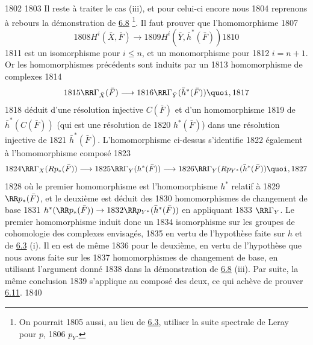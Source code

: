   1802	
  1803	Il reste à traiter le cas (iii), et pour celui-ci encore nous
  1804	reprenons à rebours la démonstration de \hyperref[XII.prop6.8]{6.8} \footnote[1]{On pourrait
  1805	aussi, au lieu de \hyperref[XII.cor6.3]{6.3}, utiliser la suite spectrale de Leray pour $p$,
  1806	$p_Y$.}. Il faut prouver que l'homomorphisme
  1807	$$
  1808	H^{i}(\bar{X},\bar{F})\longrightarrow
  1809	H^{i}(\bar{Y},\bar{h}^{\ast}(\bar{F}))
  1810	$$
  1811	est un isomorphisme pour $i\leq n$, et un monomorphisme pour
  1812	$i=n+1$. Or les homomorphismes précédents sont induits par un
  1813	homomorphisme de complexes
  1814	$$
  1815	\RR\Gamma_{\bar{X}}(\bar{F})\longrightarrow
  1816	\RR\Gamma_{\bar{Y}}(\bar{h}^{\ast}(\bar{F})){\quoi},
  1817	$$
  1818	déduit d'une résolution injective $C(\bar{F})$ et d'un homomorphisme
  1819	de $\bar{h}^{\ast}(C(\bar{F}))$ (qui est une résolution de
  1820	$h^{\ast}(\bar{F})$) dans une résolution injective de
  1821	$\bar{h}^{\ast}(\bar{F})$. L'homomorphisme ci-dessus s'identifie
  1822	également à l'homomorphisme composé
  1823	$$
  1824	\RR\Gamma_X(Rp_{\ast}(\bar{F}))\longrightarrow
  1825	\RR\Gamma_Y(h^{\ast}(\bar{F}))\longrightarrow
  1826	\RR\Gamma_Y(Rp_{Y^{\ast}}(\bar{h}^{\ast}(\bar{F})){\quoi},
  1827	$$
  1828	où le premier homomorphisme est l'homomorphisme $h^{\ast}$ relatif à
  1829	$\RR p_{\ast}(\bar{F})$, et le deuxième est déduit des
  1830	homomorphismes de changement de base
  1831	$h^{\ast}(\RR p_{\ast}(\bar{F}))\rightarrow
  1832	\RR p_{Y^{\ast}}(\bar{h}^{\ast}(\bar{F}))$ en appliquant
  1833	$\RR\Gamma_Y$. Le premier homomorphisme induit donc un
  1834	isomorphisme sur les groupes de cohomologie des complexes envisagés,
  1835	en vertu de l'hypothèse faite sur $h$ et de \hyperref[XII.cor6.3]{6.3} (i). Il en est de même
  1836	pour le deuxième, en vertu de l'hypothèse que nous avons faite sur les
  1837	homomorphismes de changement de base, en utilisant l'argument donné
  1838	dans la démonstration de \hyperref[XII.prop6.8]{6.8} (iii). Par suite, la même conclusion
  1839	s'applique au composé des deux, ce qui achève de prouver \hyperref[XII.prop6.11]{6.11}.
  1840	
